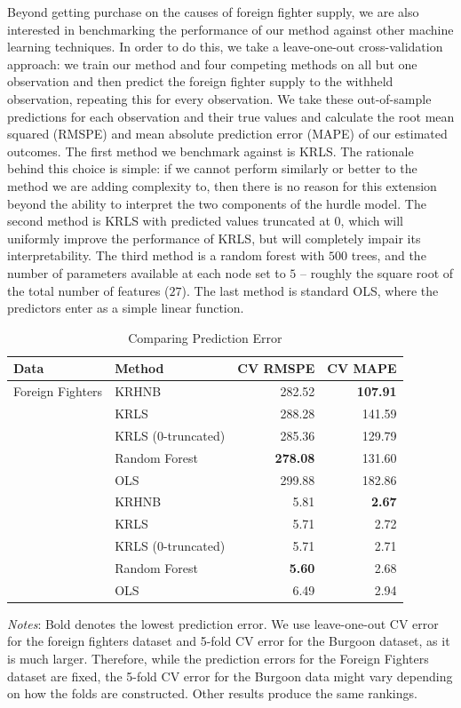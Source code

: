 \documentclass[12pt]{article}
\begin{document}
Beyond getting purchase on the causes of foreign fighter supply, we are also interested in benchmarking the performance of our method against other machine learning techniques. In order to do this, we take a leave-one-out cross-validation approach: we train our method and four competing methods on all but one observation and then predict the foreign fighter supply to the withheld observation, repeating this for every observation. We take these out-of-sample predictions for each observation and their true values and calculate the root mean squared (RMSPE) and mean absolute prediction error (MAPE) of our estimated outcomes. The first method we benchmark against is KRLS. The rationale behind this choice is simple: if we cannot perform similarly or better to the method we are adding complexity to, then there is no reason for this extension beyond the ability to interpret the two components of the hurdle model. The second method is KRLS with predicted values truncated at $0$, which will uniformly improve the performance of KRLS, but will completely impair its interpretability. The third method is a random forest \citep{Breiman2001} with $500$ trees, and the number of parameters available at each node set to $5$ -- roughly the square root of the total number of features ($27$). The last method is standard OLS, where the predictors enter as a simple linear function. \\


\begin{table}[!h] \centering 
	\caption{Comparing Prediction Error} 
	\label{tab:compare} 
	\begin{tabular}{ll rr}
		\\ [-1.9ex]
		\toprule
		Data & Method & \multicolumn{1}{c}{CV RMSPE} & \multicolumn{1}{c}{CV MAPE} \\
		\midrule
		Foreign Fighters & KRHNB & 282.52 & \textbf{107.91} \\
		& KRLS & 288.28 & 141.59 \\
		& KRLS (0-truncated) & 285.36 & 129.79 \\
		& Random Forest & \textbf{278.08} & 131.60 \\
		& OLS & 299.88 & 182.86 \\
		\midrule
		{\bf \cite{Burgoon2006}} & KRHNB & 5.81 & \textbf{2.67} \\
		& KRLS & 5.71 & 2.72 \\
		& KRLS (0-truncated) & 5.71 & 2.71 \\
		& Random Forest & \textbf{5.60} & 2.68 \\
		& OLS & 6.49 & 2.94 \\
		\bottomrule
	\end{tabular}
	\begin{flushleft} \footnotesize \textit{Notes}: Bold denotes the lowest prediction error. We use leave-one-out CV error for the foreign fighters dataset and 5-fold CV error for the Burgoon dataset, as it is much larger. Therefore, while the prediction errors for the Foreign Fighters dataset are fixed, the 5-fold CV error for the Burgoon data might vary depending on how the folds are constructed. Other results produce the same rankings. \end{flushleft}
\end{table}
\end{document}
